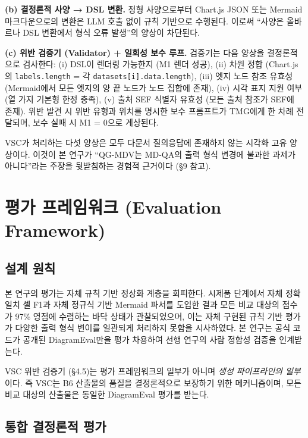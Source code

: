 \documentclass[11pt]{article}
\begin{document}
\textbf{(b) 결정론적 사양 → DSL 변환.} 정형 사양으로부터 Chart.js JSON 또는 Mermaid 마크다운으로의 변환은 LLM 호출 없이 규칙 기반으로 수행된다. 이로써 ``사양은 올바르나 DSL 변환에서 형식 오류 발생''의 양상이 차단된다.

\textbf{(c) 위반 검증기 (Validator) + 일회성 보수 루프.} 검증기는 다음 양상을 결정론적으로 검사한다: (i) DSL이 렌더링 가능한지 (M1 렌더 성공), (ii) 차원 정합 (Chart.js의 \texttt{labels.length} = 각 \texttt{datasets[i].data.length}), (iii) 엣지 노드 참조 유효성 (Mermaid에서 모든 엣지의 양 끝 노드가 노드 집합에 존재), (iv) 시각 표지 지원 여부 (열 가지 기본형 한정 충족), (v) 출처 SEF 식별자 유효성 (모든 출처 참조가 SEF에 존재). 위반 발견 시 위반 유형과 위치를 명시한 보수 프롬프트가 TMG에게 한 차례 전달되며, 보수 실패 시 M1 = 0으로 계상된다.

VSC가 처리하는 다섯 양상은 모두 다문서 질의응답에 존재하지 않는 시각화 고유 양상이다. 이것이 본 연구가 ``QG-MDV는 MD-QA의 출력 형식 변경에 불과한 과제가 아니다''라는 주장을 뒷받침하는 경험적 근거이다 (\S 9 참고).

\section{평가 프레임워크 (Evaluation Framework)}

\subsection{설계 원칙}

본 연구의 평가는 자체 규칙 기반 정상화 계층을 회피한다. 시제품 단계에서 자체 정확 일치 셀 F1과 자체 정규식 기반 Mermaid 파서를 도입한 결과 모든 비교 대상의 점수가 97\% 영점에 수렴하는 바닥 상태가 관찰되었으며, 이는 자체 구현된 규칙 기반 평가가 다양한 출력 형식 변이를 일관되게 처리하지 못함을 시사하였다. 본 연구는 공식 코드가 공개된 DiagramEval만을 평가 차용하여 선행 연구의 사람 정합성 검증을 인계받는다.

VSC 위반 검증기 (\S 4.5)는 평가 프레임워크의 일부가 아니며 \emph{생성 파이프라인의 일부}이다. 즉 VSC는 B6 산출물의 품질을 결정론적으로 보장하기 위한 메커니즘이며, 모든 비교 대상의 산출물은 동일한 DiagramEval 평가를 받는다.

\subsection{통합 결정론적 평가}
\end{document}

